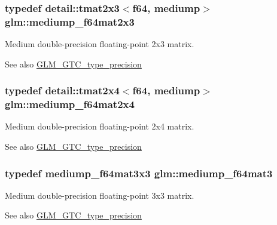 \subsubsection[{\texorpdfstring{mediump\+\_\+f64mat2x3}{mediump_f64mat2x3}}]{\setlength{\rightskip}{0pt plus 5cm}typedef detail\+::tmat2x3$<$f64, mediump$>$ {\bf glm\+::mediump\+\_\+f64mat2x3}}\hypertarget{group__gtc__type__precision_ga6f463cb5e9b4e5c07a385843ed50e6b8}{}\label{group__gtc__type__precision_ga6f463cb5e9b4e5c07a385843ed50e6b8}
Medium double-\/precision floating-\/point 2x3 matrix. \begin{DoxySeeAlso}{See also}
\hyperlink{group__gtc__type__precision}{G\+L\+M\+\_\+\+G\+T\+C\+\_\+type\+\_\+precision} 
\end{DoxySeeAlso}
\subsubsection[{\texorpdfstring{mediump\+\_\+f64mat2x4}{mediump_f64mat2x4}}]{\setlength{\rightskip}{0pt plus 5cm}typedef detail\+::tmat2x4$<$f64, mediump$>$ {\bf glm\+::mediump\+\_\+f64mat2x4}}\hypertarget{group__gtc__type__precision_ga65c67789f7e2ff605d8f48dc3750a515}{}\label{group__gtc__type__precision_ga65c67789f7e2ff605d8f48dc3750a515}
Medium double-\/precision floating-\/point 2x4 matrix. \begin{DoxySeeAlso}{See also}
\hyperlink{group__gtc__type__precision}{G\+L\+M\+\_\+\+G\+T\+C\+\_\+type\+\_\+precision} 
\end{DoxySeeAlso}
\subsubsection[{\texorpdfstring{mediump\+\_\+f64mat3}{mediump_f64mat3}}]{\setlength{\rightskip}{0pt plus 5cm}typedef mediump\+\_\+f64mat3x3 {\bf glm\+::mediump\+\_\+f64mat3}}\hypertarget{group__gtc__type__precision_gae38a4a0b57e25d9cbb153dcaab9432ec}{}\label{group__gtc__type__precision_gae38a4a0b57e25d9cbb153dcaab9432ec}
Medium double-\/precision floating-\/point 3x3 matrix. \begin{DoxySeeAlso}{See also}
\hyperlink{group__gtc__type__precision}{G\+L\+M\+\_\+\+G\+T\+C\+\_\+type\+\_\+precision} 
\end{DoxySeeAlso}
